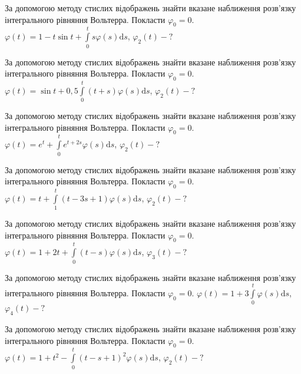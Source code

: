 \documentclass[12pt]{extarticle}
\begin{document}
\begin{Exercise}
За допомогою методу стислих відображень знайти вказане наближення розв’язку інтегрального рівняння Вольтерра. Покласти $\varphi_0=0$. $\varphi(t) = 1 - t\sin t + \int\limits_{0}^{t} s \varphi(s) \mathrm{d}s$, $\varphi_2(t) - ?$
\end{Exercise}

\begin{Exercise}
За допомогою методу стислих відображень знайти вказане наближення розв’язку інтегрального рівняння Вольтерра. Покласти $\varphi_0=0$. $\varphi(t) = \sin t + 0,5\int\limits_{0}^{t} (t+s) \varphi(s) \mathrm{d}s$, $\varphi_2(t) - ?$
\end{Exercise}

\begin{Exercise}
За допомогою методу стислих відображень знайти вказане наближення розв’язку інтегрального рівняння Вольтерра. Покласти $\varphi_0=0$. $\varphi(t) = e^t + \int\limits_{0}^{t} e^{t+2s} \varphi(s) \mathrm{d}s$, $\varphi_2(t) - ?$
\end{Exercise}

\begin{Exercise}
За допомогою методу стислих відображень знайти вказане наближення розв’язку інтегрального рівняння Вольтерра. Покласти $\varphi_0=0$. $\varphi(t) = t + \int\limits_{1}^{t} (t-3s+1)\varphi(s) \mathrm{d}s$, $\varphi_2(t) - ?$
\end{Exercise}

\begin{Exercise}
За допомогою методу стислих відображень знайти вказане наближення розв’язку інтегрального рівняння Вольтерра. Покласти $\varphi_0=0$. $\varphi(t) = 1 + 2t + \int\limits_{0}^{t} (t-s)\varphi(s) \mathrm{d}s$, $\varphi_3(t) - ?$
\end{Exercise}

\begin{Exercise}
За допомогою методу стислих відображень знайти вказане наближення розв’язку інтегрального рівняння Вольтерра. Покласти $\varphi_0=0$. $\varphi(t) = 1 + 3\int\limits_{0}^{t} \varphi(s) \mathrm{d}s$, $\varphi_4(t) - ?$
\end{Exercise}

\begin{Exercise}
За допомогою методу стислих відображень знайти вказане наближення розв’язку інтегрального рівняння Вольтерра. Покласти $\varphi_0=0$. $\varphi(t) = 1 + t^2 - \int\limits_{0}^{t} (t-s+1)^2 \varphi(s) \mathrm{d}s$, $\varphi_2(t) - ?$
\end{Exercise}
\end{document}
